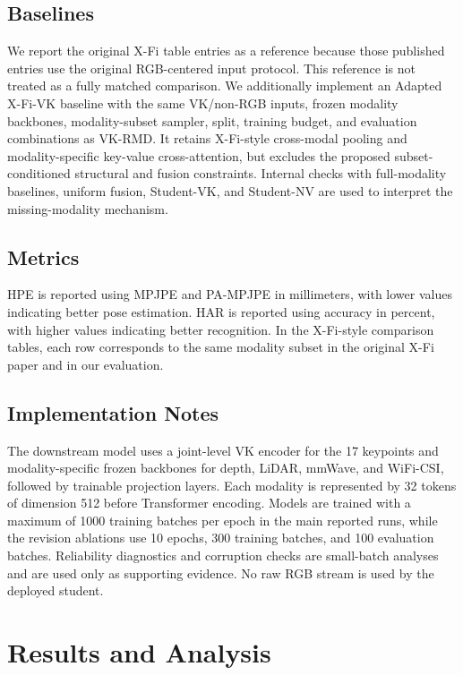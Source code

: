 ﻿\documentclass[journal]{IEEEtran}
\newcommand{\method}{VK-RMD}
\newcommand{\mpjpe}{MPJPE}
\newcommand{\pampjpe}{PA-MPJPE}
\begin{document}
\subsection{Baselines}
We report the original X-Fi table entries as a reference because those published entries use the original RGB-centered input protocol. This reference is not treated as a fully matched comparison. We additionally implement an Adapted X-Fi-VK baseline with the same VK/non-RGB inputs, frozen modality backbones, modality-subset sampler, split, training budget, and evaluation combinations as \method{}. It retains X-Fi-style cross-modal pooling and modality-specific key-value cross-attention, but excludes the proposed subset-conditioned structural and fusion constraints. Internal checks with full-modality baselines, uniform fusion, Student-VK, and Student-NV are used to interpret the missing-modality mechanism.

\subsection{Metrics}
HPE is reported using \mpjpe{} and \pampjpe{} in millimeters, with lower values indicating better pose estimation. HAR is reported using accuracy in percent, with higher values indicating better recognition. In the X-Fi-style comparison tables, each row corresponds to the same modality subset in the original X-Fi paper and in our evaluation.

\subsection{Implementation Notes}
The downstream model uses a joint-level VK encoder for the 17 keypoints and modality-specific frozen backbones for depth, LiDAR, mmWave, and WiFi-CSI, followed by trainable projection layers. Each modality is represented by 32 tokens of dimension 512 before Transformer encoding. Models are trained with a maximum of 1000 training batches per epoch in the main reported runs, while the revision ablations use 10 epochs, 300 training batches, and 100 evaluation batches. Reliability diagnostics and corruption checks are small-batch analyses and are used only as supporting evidence. No raw RGB stream is used by the deployed student.

\section{Results and Analysis}
\end{document}
